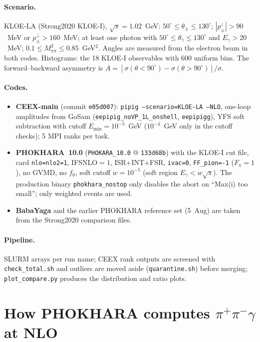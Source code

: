 \documentclass[11pt,a4paper]{article}
\newcommand{\code}[1]{\texttt{#1}}
\newcommand{\phok}{PHOKHARA}
\newcommand{\ceex}{CEEX}
\newcommand{\bby}{BabaYaga}
\newcommand{\gosam}{GoSam}
\begin{document}
\paragraph{Scenario.} KLOE-LA (Strong2020 KLOE-I), $\sqrt s=1.02$~GeV:
$50^\circ\le\theta_\pm\le130^\circ$; $|p^z_\pm|>90$~MeV or $p^\perp_\pm>160$~MeV; at least one
photon with $50^\circ\le\theta_\gamma\le130^\circ$ and $E_\gamma>20$~MeV;
$0.1\le M_{\pi\pi}^2\le0.85$~GeV$^2$. Angles are measured from the electron beam in both codes.
Histograms: the 18 KLOE-I observables with 600 uniform bins. The forward--backward asymmetry is
$A=[\sigma(\theta<90^\circ)-\sigma(\theta>90^\circ)]/\sigma$.

\paragraph{Codes.}
\begin{itemize}
\item \textbf{\ceex-main} (commit \code{e05d007}): \code{pipig --scenario=KLOE-LA --NLO}, one-loop
  amplitudes from \gosam{} (\code{eepipig\_noVP\_1L\_onshell}, \code{eepipigg}), YFS soft
  subtraction with cutoff $E_{\min}=10^{-5}$~GeV ($10^{-4}$~GeV only in the cutoff checks); 5 MPI ranks per task.
\item \textbf{\phok~10.0} (\code{PHOKARA\_10.0} @ \code{133d68b}) with the KLOE-I cut file,
  card \code{nlo=nlo2=1}, IFSNLO$=1$, ISR+INT+FSR, \code{ivac=0}, \code{FF\_pion=-1} ($F_\pi=1$),
  no GVMD, no $f_0$, soft cutoff $w=10^{-5}$ (soft region $E_\gamma<w\sqrt s$). The production
  binary \code{phokhara\_nostop} only disables the abort on ``Max(i) too small''; only weighted events are used.
\item \textbf{\bby} and the earlier \phok{} reference set (5~Aug) are taken from the Strong2020
  comparison files.
\end{itemize}

\paragraph{Pipeline.} SLURM arrays per run name; \ceex{} rank outputs are screened with
\code{check\_total.sh} and outliers are moved aside (\code{quarantine.sh}) before merging;
\code{plot\_compare.py} produces the distribution and ratio plots.

\section{\texorpdfstring{How \phok{} computes $\pi^+\pi^-\gamma$ at NLO}{How PHOKHARA computes pi+pi-gamma at NLO}}
\label{sec:phok}
\end{document}
